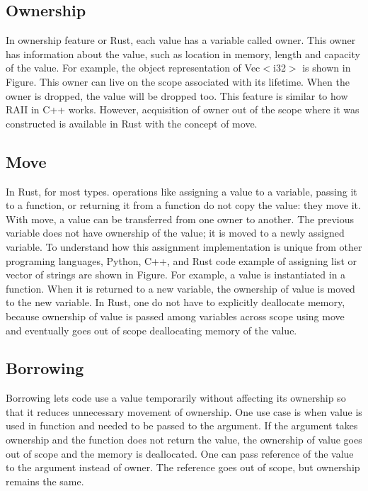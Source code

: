\subsection{Ownership}
In ownership feature or Rust, each value has a variable called owner.
This owner has information about the value, such as location in memory, length and capacity of the value. 
For example, the object representation of Vec$<$i32$>$ is shown in Figure. This owner can live on the scope associated with its lifetime.
When the owner is dropped, the value will be dropped too. This feature is similar to how RAII in C++ works. 
However, acquisition of owner out of the scope where it was constructed is available in Rust with the concept of move. 

\subsection{Move}
In Rust, for most types. operations like assigning a value to a variable, passing it to a function, or returning it from a function do not copy the value: they move it. 
With move, a value can be transferred from one owner to another. The previous variable does not have ownership of the value; it is moved to a newly assigned variable. 
To understand how this assignment implementation is unique from other programing languages, Python, C++, and Rust code example of assigning list or vector of strings are shown in Figure. 
For example, a value is instantiated in a function. 
When it is returned to a new variable, the ownership of value is moved to the new variable. In Rust, one do not have to explicitly deallocate memory, 
because ownership of value is passed among variables across scope using move and eventually goes out of scope deallocating memory of the value.

\subsection{Borrowing}
Borrowing lets code use a value temporarily without affecting its ownership so that it reduces unnecessary movement of ownership. 
One use case is when value is used in function and needed to be passed to the argument. If the argument takes ownership and the function does not return the value, 
the ownership of value goes out of scope and the memory is deallocated. One can pass reference of the value to the argument instead of owner. 
The reference goes out of scope, but ownership remains the same. 



